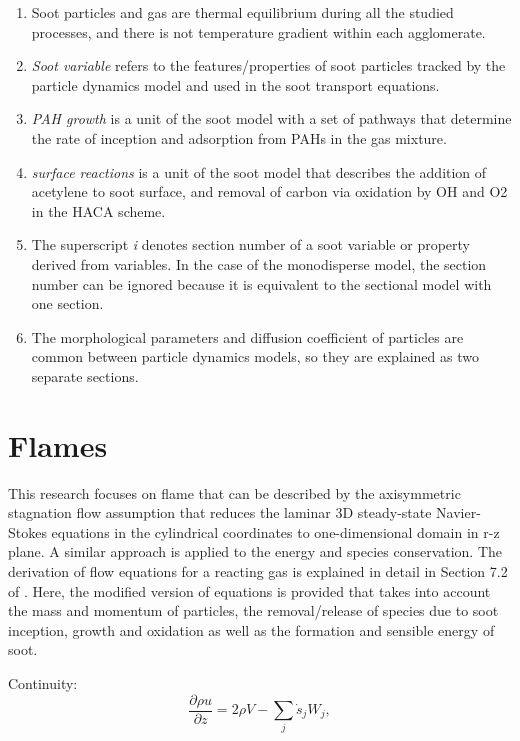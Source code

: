 \begin{enumerate}
\item Soot particles and gas are thermal equilibrium during all the studied processes, and there is not temperature gradient within each agglomerate.

\item \textit{Soot variable} refers to the features/properties of soot particles tracked by the particle dynamics model and used in the soot transport equations.

\item \textit{PAH growth} is a unit of the soot model with a set of pathways that determine the rate of inception and adsorption from PAHs in the gas mixture.

\item \textit{surface reactions} is a unit of the soot model that describes the addition of acetylene to soot surface, and removal of carbon via oxidation by OH and O2 in the HACA scheme.

\item The superscript \textit{i} denotes section number of a soot variable or property derived from variables. In the case of the monodisperse model, the section number can be ignored because it is equivalent to the sectional model with one section.

\item The morphological parameters and diffusion coefficient of particles are common between particle dynamics models, so they are explained as two separate sections.

\end{enumerate}

\section{Flames}
This research focuses on flame that can be described by the axisymmetric stagnation flow assumption that reduces the laminar 3D steady-state Navier-Stokes equations in the cylindrical coordinates to one-dimensional domain in r-z plane. A similar approach is applied to the energy and species conservation. The derivation of flow equations for a reacting gas is explained in detail in Section 7.2 of \citep{kee2017chemically}. Here, the modified version of equations is provided that takes into account the mass and momentum of particles, the removal/release of species due to soot inception, growth and oxidation as well as the formation and sensible energy of soot.

\noindent Continuity:
\begin{equation}
	\frac{\partial \rho u}{\partial z} = 2\rho V - \sum_j \dot{s}_j W_j
	\label{eqn:flame_cont},
\end{equation}

